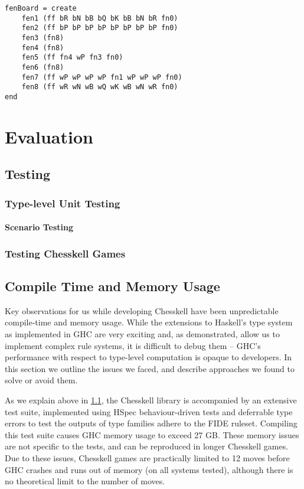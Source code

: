\documentclass[12pt, a4paper, bibliography=totocnumbered]{scrreprt}
\begin{document}
\begin{lstlisting}
fenBoard = create
    fen1 (ff bR bN bB bQ bK bB bN bR fn0)
    fen2 (ff bP bP bP bP bP bP bP bP fn0)
    fen3 (fn8)
    fen4 (fn8)
    fen5 (ff fn4 wP fn3 fn0)
    fen6 (fn8)
    fen7 (ff wP wP wP wP fn1 wP wP wP fn0)
    fen8 (ff wR wN wB wQ wK wB wN wR fn0)
end
\end{lstlisting}


\chapter{Evaluation}

\section{Testing} \label{testsection}

\subsection{Type-level Unit Testing}

\subsubsection{Scenario Testing}

\subsection{Testing Chesskell Games}

\section{Compile Time and Memory Usage} \label{problemsection}

Key observations for us while developing Chesskell have been unpredictable compile-time and memory usage. While the extensions to Haskell's type system as implemented in GHC are very exciting and, as demonstrated, allow us to implement complex rule systems, it is difficult to debug them -- GHC's performance with respect to type-level computation is opaque to developers. In this section we outline the issues we faced, and describe approaches we found to solve or avoid them.

As we explain above in \cref{testsection}, the Chesskell library is accompanied by an extensive test suite, implemented using HSpec behaviour-driven tests \cite{hspec} and deferrable type errors to test the outputs of type families adhere to the FIDE ruleset. Compiling this test suite causes GHC memory usage to exceed 27 GB. These memory issues are not specific to the tests, and can be reproduced in longer Chesskell games. Due to these issues, Chesskell games are practically limited to 12 moves before GHC crashes and runs out of memory (on all systems tested), although there is no theoretical limit to the number of moves.
\end{document}
